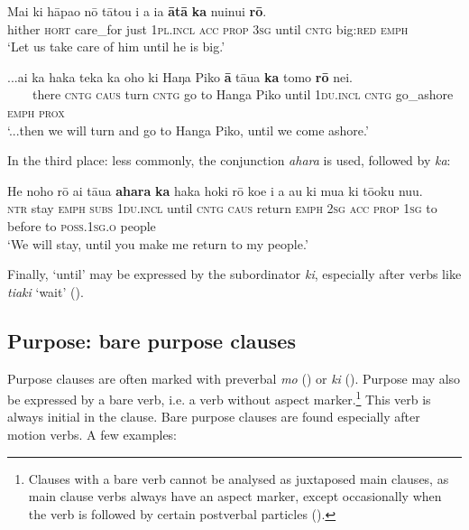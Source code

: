 \ea\label{ex:11.241}
\gll Mai ki hāpa{\ꞌ}o nō tātou i a ia \textbf{{\ꞌ}ātā} \textbf{ka} nuinui \textbf{rō}.\\
hither \textsc{hort} care\_for just \textsc{1pl.incl} \textsc{acc} \textsc{prop} \textsc{3sg} until \textsc{cntg} big:\textsc{red} \textsc{emph}\\

\glt 
‘Let us take care of him until he is big.’ \textstyleExampleref{[R211.063]} 
\z

\ea\label{ex:11.242}
\gll ...{\ꞌ}ai ka haka teka ka oho ki Haŋa Piko  \textbf{{\ꞌ}ā} tāua \textbf{ka} tomo \textbf{rō} nei.\\
~~~~there \textsc{cntg} \textsc{caus} turn \textsc{cntg} go to Hanga Piko  until \textsc{1du.incl} \textsc{cntg} go\_ashore \textsc{emph} \textsc{prox}\\

\glt 
‘...then we will turn and go to Hanga Piko, until we come ashore.’ \textstyleExampleref{[R230.401]} 
\z

In the third place: less commonly, the conjunction \textit{{\ꞌ}ahara} is used, followed by \textit{ka}:

\ea\label{ex:11.243}
\gll He noho rō {\ꞌ}ai tāua \textbf{{\ꞌ}ahara} \textbf{ka} haka hoki rō koe i a au  ki mu{\ꞌ}a ki tō{\ꞌ}oku nu{\ꞌ}u.\\
\textsc{ntr} stay \textsc{emph} \textsc{subs} \textsc{1du.incl} until \textsc{cntg} \textsc{caus} return \textsc{emph} \textsc{2sg} \textsc{acc} \textsc{prop} \textsc{1sg}  to before to \textsc{poss.1sg.o} people\\

\glt 
‘We will stay, until you make me return to my people.’ \textstyleExampleref{[Fel-1978.115]}
\z

Finally, ‘until’ may be expressed by the subordinator \textit{ki}, especially after verbs like \textit{tiaki} ‘wait’ ().

\subsection{Purpose: bare purpose clauses}\label{sec:11.6.3}
Purpose clauses are often marked with preverbal \textit{mo} () or \textit{ki} (). Purpose may also be expressed by a bare verb, i.e. a verb without aspect marker.\footnote{\label{fn:532}Clauses with a bare verb cannot be analysed as juxtaposed main clauses, as main clause verbs always have an aspect marker, except occasionally when the verb is followed by certain postverbal particles ().} This verb is always initial in the clause. Bare purpose clauses are found especially after motion verbs. A few examples:

